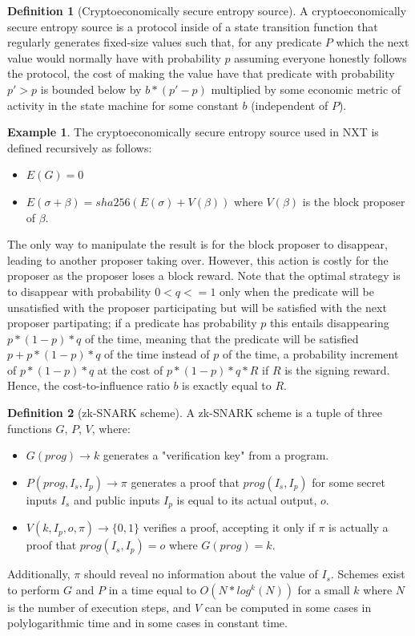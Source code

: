 \documentclass[11pt,a4paper]{report}
\theoremstyle{plain}
\theoremstyle{definition}
\newtheorem{defn}{Definition}[chapter]
\newtheorem{exmp}{Example}[section]
\theoremstyle{remark}
\begin{document}
\begin{defn}[Cryptoeconomically secure entropy source]
A cryptoeconomically secure entropy source is a protocol inside of a state transition function that regularly generates fixed-size values such that, for any predicate $P$ which the next value would normally have with probability $p$ assuming everyone honestly follows the protocol, the cost of making the value have that predicate with probability $p' > p$ is bounded below by $b * (p' - p)$ multiplied by some economic metric of activity in the state machine for some constant $b$ (independent of $P$).
\end{defn}

\begin{exmp}
The cryptoeconomically secure entropy source used in NXT\cite{nxtinside} is defined recursively as follows:
\begin{itemize}
\item
$E(G) = 0$
\item 
$E(\sigma + \beta) = sha256(E(\sigma) + V(\beta))$ where $V(\beta)$ is the block proposer of $\beta$.
\end{itemize}
The only way to manipulate the result is for the block proposer to disappear, leading to another proposer taking over. However, this action is costly for the proposer as the proposer loses a block reward. Note that the optimal strategy is to disappear with probability $0 < q <= 1$ only when the predicate will be unsatisfied with the proposer participating but will be satisfied with the next proposer partipating; if a predicate has probability $p$ this entails disappearing $p * (1-p) * q$ of the time, meaning that the predicate will be satisfied $p + p * (1-p) * q$ of the time instead of $p$ of the time, a probability increment of $p * (1-p) * q$ at the cost of $p * (1-p) * q * R$ if $R$ is the signing reward. Hence, the cost-to-influence ratio $b$ is exactly equal to $R$.
\end{exmp}

\begin{defn}[zk-SNARK scheme]
A zk-SNARK scheme is a tuple of three functions $G$, $P$, $V$, where:
\begin{itemize}
\item
$G(prog) \rightarrow k$ generates a "verification key" from a program.
\item
$P(prog, I_s, I_p) \rightarrow \pi$ generates a proof that $prog(I_s, I_p)$ for some secret inputs $I_s$ and public inputs $I_p$ is equal to its actual output, $o$.
\item
$V(k, I_p, o, \pi) \rightarrow \{0, 1\}$ verifies a proof, accepting it only if $\pi$ is actually a proof that $prog(I_s, I_p) = o$ where $G(prog) = k$.
\end{itemize}
Additionally, $\pi$ should reveal no information about the value of $I_s$. Schemes exist \cite{snark} to perform $G$ and $P$ in a time equal to $O(N*log^k(N))$ for a small $k$ where $N$ is the number of execution steps, and $V$ can be computed in some cases in polylogarithmic time and in some cases in constant time.
\end{defn}
\end{document}
